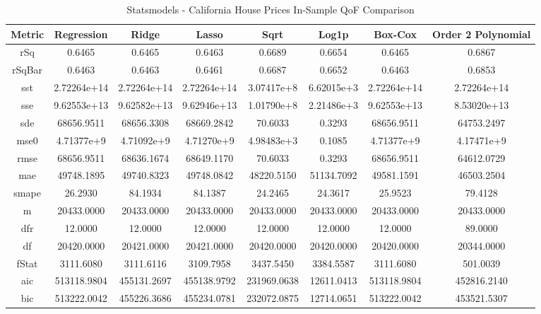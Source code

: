 \documentclass{article}
\begin{document}
\begin{table}[H]
\centering
\caption{Statsmodels - California House Prices In-Sample QoF Comparison}
\label{tab:Statsmodels - House Prices In-Sample QoF Comparison}
\begin{tabular}{|c|c|c|c|c|c|c|c|}\hline
Metric & Regression & Ridge & Lasso & Sqrt & Log1p & Box-Cox & Order 2 Polynomial \\ \hline \hline
rSq & 0.6465 & 0.6465 & 0.6463 & 0.6689 & 0.6654 & 0.6465 & 0.6867 \\ \hline
rSqBar & 0.6463 & 0.6463 & 0.6461 & 0.6687 & 0.6652 & 0.6463 & 0.6853 \\ \hline
sst & 2.72264e+14 & 2.72264e+14 & 2.72264e+14 & 3.07417e+8 & 6.62015e+3 & 2.72264e+14 & 2.72264e+14 \\ \hline
sse & 9.62553e+13 & 9.62582e+13 & 9.62946e+13 & 1.01790e+8 & 2.21486e+3 & 9.62553e+13 & 8.53020e+13 \\ \hline
sde & 68656.9511 & 68656.3308 & 68669.2842 & 70.6033 & 0.3293 & 68656.9511 & 64753.2497 \\ \hline
mse0 & 4.71377e+9 & 4.71092e+9 & 4.71270e+9 & 4.98483e+3 & 0.1085 & 4.71377e+9 & 4.17471e+9 \\ \hline
rmse & 68656.9511 & 68636.1674 & 68649.1170 & 70.6033 & 0.3293 & 68656.9511 & 64612.0729 \\ \hline
mae & 49748.1895 & 49740.8323 & 49748.0842 & 48220.5150 & 51134.7092 & 49581.1591 & 46503.2504 \\ \hline
smape & 26.2930 & 84.1934 & 84.1387 & 24.2465 & 24.3617 & 25.9523 & 79.4128 \\ \hline
m & 20433.0000 & 20433.0000 & 20433.0000 & 20433.0000 & 20433.0000 & 20433.0000 & 20433.0000 \\ \hline
dfr & 12.0000 & 12.0000 & 12.0000 & 12.0000 & 12.0000 & 12.0000 & 89.0000 \\ \hline
df & 20420.0000 & 20421.0000 & 20421.0000 & 20420.0000 & 20420.0000 & 20420.0000 & 20344.0000 \\ \hline
fStat & 3111.6080 & 3111.6116 & 3109.7958 & 3437.5450 & 3384.5587 & 3111.6080 & 501.0039 \\ \hline
aic & 513118.9804 & 455131.2697 & 455138.9792 & 231969.0638 & 12611.0413 & 513118.9804 & 452816.2140 \\ \hline
bic & 513222.0042 & 455226.3686 & 455234.0781 & 232072.0875 & 12714.0651 & 513222.0042 & 453521.5307 \\ \hline
\end{tabular}
\end{table}
\end{document}

